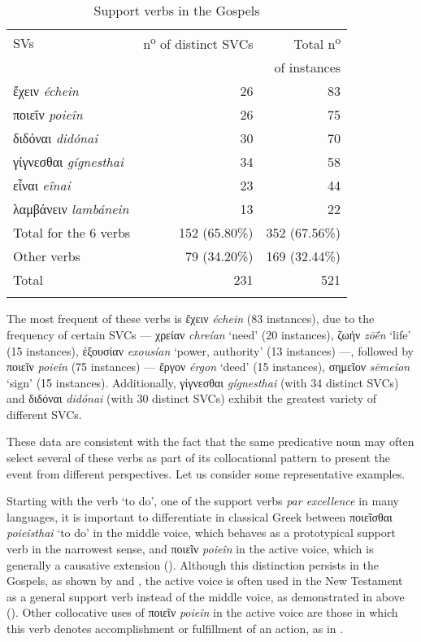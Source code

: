 \documentclass[output=paper,colorlinks,citecolor=brown]{langscibook}
\begin{document}
\begin{table}
\caption{Support verbs in the Gospels}
  \label{tbl:bj:gospels}
\centering
\begin{tabularx}{.8\textwidth}{lrr}
\lsptoprule
SVs & n\textsuperscript{o} of distinct SVCs & Total n\textsuperscript{o}\\
& & of instances \\
\midrule
ἔχειν \emph{échein} & 26 & 83\\
ποιεῖν \emph{poieîn} & 26 & 75\\
διδόναι \emph{didónai} & 30 & 70\\
γίγνεσθαι \emph{gígnesthai} & 34 & 58\\
εἶναι \emph{eînai} & 23 & 44\\
λαμβάνειν \emph{lambánein} & 13 & 22\\
Total for the 6 verbs & 152 (65.80\%) & 352 (67.56\%)\\
Other verbs & 79 (34.20\%) & 169 (32.44\%)\\
Total & 231 & 521\\
\lspbottomrule
\end{tabularx}
\end{table}

The most frequent of these verbs is ἔχειν \emph{échein} (83 instances), due to the
frequency of certain SVCs --- χρείαν \emph{chreían} `need' (20 instances), ζωήν
\emph{zōḗn} `life' (15 instances), ἐξουσίαν \emph{exousían} `power, authority' (13
instances) ---, followed by ποιεῖν \emph{poieîn} (75 instances)  --- ἔργον \emph{érgon}
`deed' (15 instances), σημεῖον \emph{sēmeîon} `sign' (15 instances). Additionally,
γίγνεσθαι \emph{gígnesthai} (with 34 distinct SVCs) and διδόναι \emph{didónai} (with
30 distinct SVCs) exhibit the greatest variety of different SVCs.

These data are consistent with the fact that the same predicative noun may often select
several of these verbs as part of its collocational pattern to present the event from
different perspectives. Let us consider some representative examples.

Starting with the verb `to do', one of the support verbs \textit{par excellence} in many languages,
it is important to differentiate in classical Greek between ποιεῖσθαι \emph{poieîsthai}
`to do' in the middle voice, which behaves as a prototypical support verb in the narrowest
sense, and ποιεῖν \emph{poieîn} in the active voice, which is generally a causative
extension (\cite{JiménezLópez2012}). Although this distinction persists in the Gospels, as
shown by  and , the active voice is often used in the New
Testament as a general support verb instead of the middle voice, as demonstrated in
 above (\cite[103--113]{JiménezLópezM.Dolores-2018285}). Other collocative uses
of ποιεῖν \emph{poieîn} in the active voice are those in which this verb denotes
accomplishment or fulfillment of an action, as in .
\end{document}
